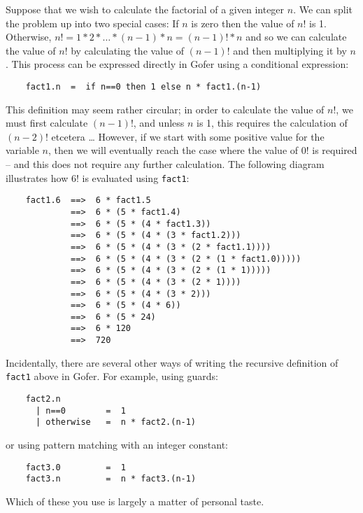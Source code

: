 Suppose that we wish to calculate the factorial of a given  integer  $n$.
We can split the problem up into two special cases:
\BSI
\IT  If $n$ is zero then the value of $n!$ is 1.
\IT  Otherwise, $n!  = 1 * 2 * \dots * (n\!-\!1) * n = (n\!-\!1)! * n$  
     and  so  we
     can calculate the value of $n!$ by 
     calculating the value  of  $(n\!-\!1)!$
     and then multiplying it by $n$.
\ESI
This process can be expressed directly in  Gofer  using  a  conditional
expression:
\begin{verbatim}
    fact1.n  =  if n==0 then 1 else n * fact1.(n-1)
\end{verbatim}
This definition may seem rather circular; in  order  to  calculate  the
value of $n!$, we must first calculate $(n-1)!$, and unless $n$  is  1,  this
requires the calculation of $(n-2)!$ etcetera \dots
However, if  we  start  with
some positive value for the variable $n$, then we will  eventually  reach
the case where the value of $0!$ is required -- and this does not require
any further calculation.  The following diagram illustrates how  $6!$  is
evaluated using \verb"fact1":
\begin{verbatim}
    fact1.6  ==>  6 * fact1.5
             ==>  6 * (5 * fact1.4)
             ==>  6 * (5 * (4 * fact1.3))
             ==>  6 * (5 * (4 * (3 * fact1.2)))
             ==>  6 * (5 * (4 * (3 * (2 * fact1.1))))
             ==>  6 * (5 * (4 * (3 * (2 * (1 * fact1.0)))))
             ==>  6 * (5 * (4 * (3 * (2 * (1 * 1)))))
             ==>  6 * (5 * (4 * (3 * (2 * 1))))
             ==>  6 * (5 * (4 * (3 * 2)))
             ==>  6 * (5 * (4 * 6))
             ==>  6 * (5 * 24)
             ==>  6 * 120
             ==>  720
\end{verbatim}
Incidentally, there are several other ways  of  writing  the  recursive
definition of \verb"fact1" above in Gofer.  For example, using guards:
\begin{verbatim}
    fact2.n
      | n==0        =  1
      | otherwise   =  n * fact2.(n-1)
\end{verbatim}
or using pattern matching with an integer constant:
\begin{verbatim}
    fact3.0         =  1
    fact3.n         =  n * fact3.(n-1)
\end{verbatim}
Which of these you use is largely a matter of personal taste.

